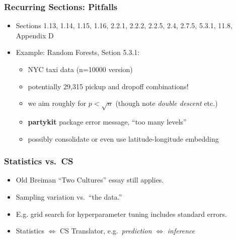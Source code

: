 \documentclass{beamer}
\begin{document}
\begin{frame} 
\frametitle{Recurring Sections: Pitfalls}

\begin{itemize}

\item Sections 1.13, 1.14, 1.15, 1.16, 2.2.1, 2.2.2, 2.2.5, 2.4, 2.7.5,
5.3.1, 11.8, Appendix D

\item Example: Random Forests, Setion 5.3.1: 

   \begin{itemize}
   
   \item NYC taxi data (n=10000 version) 
   
   \item potentially 29,315
   pickup and dropoff combinations! 
   
   \item we aim roughly for $p < \sqrt{n}$ (though note \textit{double
   descent} etc.)
   
   \item \textbf{partykit} package error message, ``too many levels'' 
   
   \item possibly consolidate or even use latitude-longitude embedding
   
   \end{itemize} 

\end{itemize} 

\end{frame} 

\begin{frame} 
\frametitle{Statistics vs.\ CS}

\begin{itemize} 

\item Old Breiman ``Two Cultures'' essay still applies.

\item Sampling variation vs.\ ``the data.''

\item E.g. grid search for hyperparameter tuning includes standard errors.

\item Statistics $\iff$ CS Translator, e.g.\ \textit{prediction}
$\iff$ \textit{inference}

\end{itemize} 

\end{frame}
\end{document}
